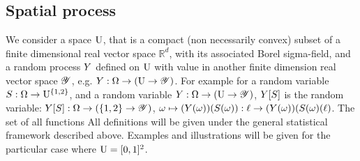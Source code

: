 \subsection{Spatial process}
We consider a space $\mathrm{U}$, that is a compact (non necessarily convex) subset of a finite dimensional real vector space $\mathbb{R}^d$, with its associated Borel sigma-field, and a random process $Y$ defined on $\mathrm{U}$ with value in another finite dimension real vector space $\mathscr{Y}$, e.g. $Y:\Omega\to(\mathrm{U}\to\mathscr{Y})$.
 For example for a random variable $S:\Omega\to\mathrm{U}^{\{1,2\}}$, and a random variable
$Y:\Omega\to(\mathrm{U}\to\mathscr{Y})$, 
$Y[S]$ is the random variable: $Y[S]:\Omega\to(\{1,2\}\to\mathscr{Y})$, $\omega\mapsto(Y(\omega))(S(\omega)):\ell\to(Y(\omega))(S(\omega)(\ell)$.
The set of all functions 
All definitions will be given under the general statistical framework described above. Examples and illustrations will be given for the particular case where $\mathrm{U}=[0,1]^2$.
